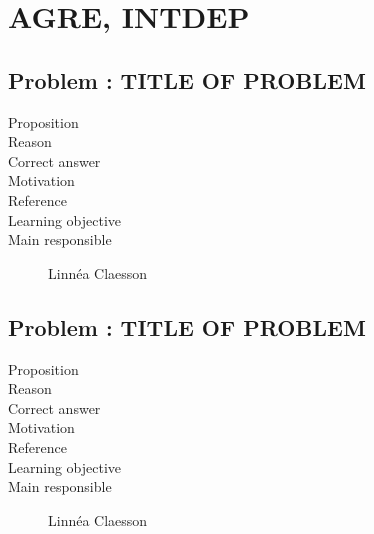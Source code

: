 \documentclass[10pt,a4paper]{article}
\begin{document}
\section*{AGRE, INTDEP}
\subsection*{Problem : TITLE OF PROBLEM}
\begin{description}
\item[Proposition] 
\item[Reason] 
\item[Correct answer]
\item[Motivation]
\item[Reference]
\item[Learning objective]
\item[Main responsible] Linn\'ea Claesson
\end{description}

\subsection*{Problem : TITLE OF PROBLEM}
\begin{description}
\item[Proposition] 
\item[Reason] 
\item[Correct answer]
\item[Motivation]
\item[Reference]
\item[Learning objective]
\item[Main responsible] Linn\'ea Claesson
\end{description}
\end{document}
